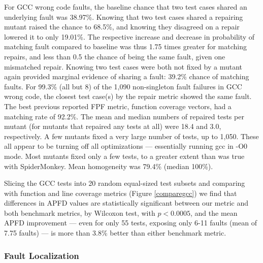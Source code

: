 For GCC wrong code faults, the baseline chance that two test cases shared an underlying fault was 38.97\%.  Knowing that two test cases shared a repairing mutant raised the chance to 68.5\%, and knowing they disagreed on a repair lowered it to only 19.01\%.  The respective increase and decrease in probability of matching fault compared to baseline was thus 1.75 times greater for matching repairs, and less than 0.5 the chance of being the same fault, given one mismatched repair.  Knowing two test cases were both not fixed by a mutant again provided marginal evidence of sharing a fault: 39.2\% chance of matching faults.
For 99.3\% (all but 8) of the 1,090 non-singleton fault failures in GCC wrong code, the closest test case(s) by the repair metric showed the same fault.  The best previous reported FPF metric, function coverage vectors, had a matching rate of 92.2\%.   The mean and median numbers of repaired tests per mutant (for mutants that repaired any tests at all) were 18.4 and 3.0, respectively.  A few mutants fixed a very large number of tests, up to 1,050.  These all appear to be turning off all optimizations --- essentially running gcc in -O0 mode.  Most mutants fixed only a few tests, to a greater extent than was true with SpiderMonkey.    Mean homogeneity was 79.4\% (median 100\%).

Slicing the GCC tests into 20 random equal-sized test subsets and comparing with function and line coverage metrics (Figure \ref{comparegcc}) we find that differences in APFD values are statistically significant between our metric and both benchmark metrics, by Wilcoxon test, with $p < 0.0005$, and the mean APFD improvement --- even for only 55 tests, exposing only 6-11 faults (mean of 7.75 faults) --- is more than 3.8\% better than either benchmark metric.


\subsubsection{Fault Localization}

